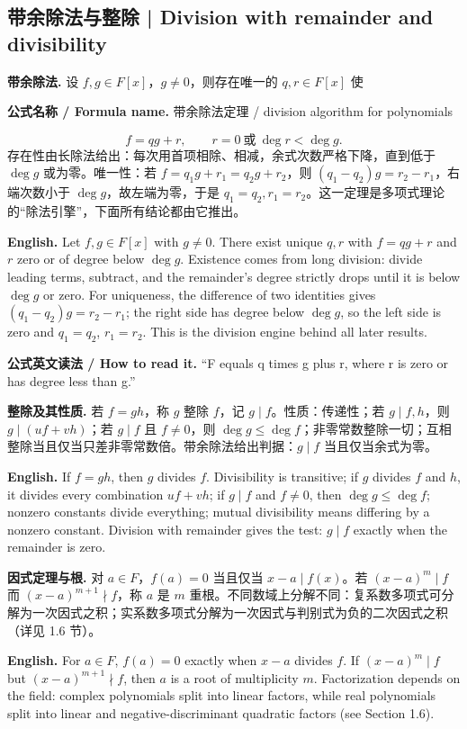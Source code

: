\documentclass[UTF8,11pt,a4paper]{ctexart}
\newcommand{\EN}[1]{\par\noindent\textbf{English.} #1\par}
\newcommand{\READ}[1]{\par\noindent\textbf{公式英文读法 / How to read it.} #1\par}
\newcommand{\FORMULA}[2]{\par\noindent\textbf{公式名称 / Formula name.} #1 / #2\par}
\begin{document}
\subsection{带余除法与整除 | Division with remainder and divisibility}
\noindent\textbf{带余除法.} 设 $f,g\in F[x]$，$g\ne0$，则存在唯一的 $q,r\in F[x]$ 使
\FORMULA{带余除法定理}{division algorithm for polynomials}
\[
f=qg+r,\qquad r=0\ \text{或}\ \deg r<\deg g.
\]
存在性由长除法给出：每次用首项相除、相减，余式次数严格下降，直到低于 $\deg g$ 或为零。唯一性：若 $f=q_1g+r_1=q_2g+r_2$，则 $(q_1-q_2)g=r_2-r_1$，右端次数小于 $\deg g$，故左端为零，于是 $q_1=q_2,r_1=r_2$。这一定理是多项式理论的“除法引擎”，下面所有结论都由它推出。
\EN{Let $f,g\in F[x]$ with $g\ne0$. There exist unique $q,r$ with $f=qg+r$ and $r$ zero or of degree below $\deg g$. Existence comes from long division: divide leading terms, subtract, and the remainder's degree strictly drops until it is below $\deg g$ or zero. For uniqueness, the difference of two identities gives $(q_1-q_2)g=r_2-r_1$; the right side has degree below $\deg g$, so the left side is zero and $q_1=q_2$, $r_1=r_2$. This is the division engine behind all later results.}
\READ{``F equals q times g plus r, where r is zero or has degree less than g.''}
\noindent\textbf{整除及其性质.} 若 $f=gh$，称 $g$ 整除 $f$，记 $g\mid f$。性质：传递性；若 $g\mid f,h$，则 $g\mid(uf+vh)$；若 $g\mid f$ 且 $f\ne0$，则 $\deg g\le\deg f$；非零常数整除一切；互相整除当且仅当只差非零常数倍。带余除法给出判据：$g\mid f$ 当且仅当余式为零。
\EN{If $f=gh$, then $g$ divides $f$. Divisibility is transitive; if $g$ divides $f$ and $h$, it divides every combination $uf+vh$; if $g\mid f$ and $f\ne0$, then $\deg g\le\deg f$; nonzero constants divide everything; mutual divisibility means differing by a nonzero constant. Division with remainder gives the test: $g\mid f$ exactly when the remainder is zero.}
\noindent\textbf{因式定理与根.} 对 $a\in F$，$f(a)=0$ 当且仅当 $x-a\mid f(x)$。若 $(x-a)^m\mid f$ 而 $(x-a)^{m+1}\nmid f$，称 $a$ 是 $m$ 重根。不同数域上分解不同：复系数多项式可分解为一次因式之积；实系数多项式分解为一次因式与判别式为负的二次因式之积（详见 1.6 节）。
\EN{For $a\in F$, $f(a)=0$ exactly when $x-a$ divides $f$. If $(x-a)^m\mid f$ but $(x-a)^{m+1}\nmid f$, then $a$ is a root of multiplicity $m$. Factorization depends on the field: complex polynomials split into linear factors, while real polynomials split into linear and negative-discriminant quadratic factors (see Section 1.6).}
\end{document}
